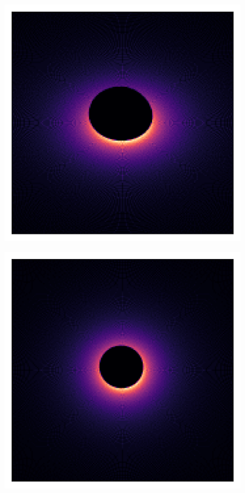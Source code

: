 \documentclass{beamer}
\begin{document}
\begin{frame}{}
    \centering

    \includegraphics[width=0.8\textwidth]{asset/bh_0.75_45.png}

\end{frame}


\begin{frame}{}
    \centering

    \includegraphics[width=0.8\textwidth]{asset/bh_0.95_20.png}

\end{frame}
\end{document}
